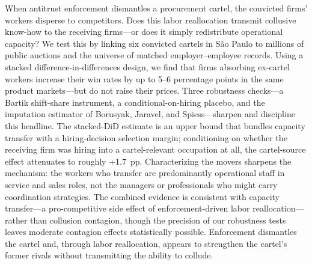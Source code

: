 When antitrust enforcement dismantles a procurement cartel, the convicted firms' workers disperse to competitors. Does this labor reallocation transmit collusive know-how to the receiving firms---or does it simply redistribute operational capacity? We test this by linking six convicted cartels in S\~{a}o Paulo to millions of public auctions and the universe of matched employer--employee records. Using a stacked difference-in-differences design, we find that firms absorbing ex-cartel workers increase their win rates by up to 5--6 percentage points in the same product markets---but do not raise their prices. Three robustness checks---a Bartik shift-share instrument, a conditional-on-hiring placebo, and the imputation estimator of Borusyak, Jaravel, and Spiess---sharpen and discipline this headline. The stacked-DiD estimate is an upper bound that bundles capacity transfer with a hiring-decision selection margin; conditioning on whether the receiving firm was hiring into a cartel-relevant occupation at all, the cartel-source effect attenuates to roughly $+1.7$~pp. Characterizing the movers sharpens the mechanism: the workers who transfer are predominantly operational staff in service and sales roles, not the managers or professionals who might carry coordination strategies. The combined evidence is consistent with capacity transfer---a pro-competitive side effect of enforcement-driven labor reallocation---rather than collusion contagion, though the precision of our robustness tests leaves moderate contagion effects statistically possible. Enforcement dismantles the cartel and, through labor reallocation, appears to strengthen the cartel's former rivals without transmitting the ability to collude.
